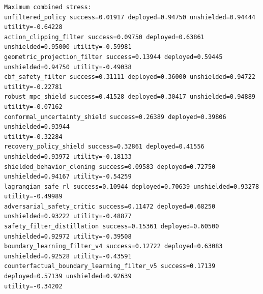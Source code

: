 \documentclass{article}
\begin{document}
\begin{tiny}
\begin{verbatim}
Maximum combined stress:
unfiltered_policy success=0.01917 deployed=0.94750 unshielded=0.94444 utility=-0.64228
action_clipping_filter success=0.09750 deployed=0.63861 unshielded=0.95000 utility=-0.59981
geometric_projection_filter success=0.13944 deployed=0.59445 unshielded=0.94750 utility=-0.49038
cbf_safety_filter success=0.31111 deployed=0.36000 unshielded=0.94722 utility=-0.22781
robust_mpc_shield success=0.41528 deployed=0.30417 unshielded=0.94889 utility=-0.07162
conformal_uncertainty_shield success=0.26389 deployed=0.39806 unshielded=0.93944
utility=-0.32284
recovery_policy_shield success=0.32861 deployed=0.41556 unshielded=0.93972 utility=-0.18133
shielded_behavior_cloning success=0.09583 deployed=0.72750 unshielded=0.94167 utility=-0.54259
lagrangian_safe_rl success=0.10944 deployed=0.70639 unshielded=0.93278 utility=-0.49989
adversarial_safety_critic success=0.11472 deployed=0.68250 unshielded=0.93222 utility=-0.48877
safety_filter_distillation success=0.15361 deployed=0.60500 unshielded=0.92972 utility=-0.39508
boundary_learning_filter_v4 success=0.12722 deployed=0.63083 unshielded=0.92528 utility=-0.43591
counterfactual_boundary_learning_filter_v5 success=0.17139 deployed=0.57139 unshielded=0.92639
utility=-0.34202


\end{verbatim}
\end{tiny}
\end{document}

